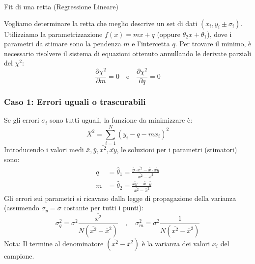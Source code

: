 \documentclass[openany,a4paper,12pt]{book}
\theoremstyle{remark}
\begin{document}
\begin{bressan}{Fit di una retta (Regressione Lineare)}

Vogliamo determinare la retta che meglio descrive un set di dati $(x_i, y_i \pm \sigma_i)$.
Utilizziamo la parametrizzazione $f(x) = mx + q$ (oppure $\theta_2 x + \theta_1$), dove i parametri da stimare sono la pendenza $m$ e l'intercetta $q$.
Per trovare il minimo, è necessario risolvere il sistema di equazioni ottenuto annullando le derivate parziali del $\chi^2$:
\[ \frac{\partial \chi^2}{\partial m}=0 \quad \text{e} \quad \frac{\partial \chi^2}{\partial q}=0 \]

\subsubsection*{Caso 1: Errori uguali o trascurabili}
Se gli errori $\sigma_i$ sono tutti uguali, la funzione da minimizzare è:
\[
X^2 = \sum_{i=1}^{N} (y_i - q - m x_i)^2
\]
Introducendo i valori medi $\bar{x}, \bar{y}, \overline{x^2}, \overline{xy}$, le soluzioni per i parametri (stimatori) sono:
\[ 
\begin{split}
q &= \hat{\theta}_1 = \frac{\bar{y} \cdot \overline{x^2} - \bar{x} \cdot \overline{xy}}{\overline{x^2} - \bar{x}^2} \\
m &= \hat{\theta}_2 = \frac{\overline{xy} - \bar{x} \cdot \bar{y}}{\overline{x^2} - \bar{x}^2}
\end{split}
\]
Gli errori sui parametri si ricavano dalla legge di propagazione della varianza (assumendo $\sigma_y = \sigma$ costante per tutti i punti):
\[
\sigma_q^2 = \sigma^2 \frac{\overline{x^2}}{N(\overline{x^2}-\bar{x}^2)}
\quad , \quad
\sigma_m^2 = \sigma^2 \frac{1}{N(\overline{x^2}-\bar{x}^2)}
\]
Nota: Il termine al denominatore $(\overline{x^2}-\bar{x}^2)$ è la varianza dei valori $x_i$ del campione.


\end{bressan}
\end{document}

